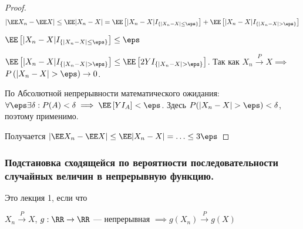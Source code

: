 \begin{proof} 
\[
    |\EE X_n - \EE X| \leq \EE |X_n - X| = 
    \EE \left[ |X_n - X| I_{\left\{ |X_n - X| \leq \eps \right\}} \right] + 
    \EE \left[ |X_n - X| I_{\left\{ |X_n - X| > \eps \right\}} \right]
\]

$\EE \left[ |X_n - X| I_{\left\{ |X_n - X| \leq \eps \right\}} \right] \leq \eps$

$\EE \left[ |X_n - X| I_{\left\{ |X_n - X| > \eps \right\}} \right] \leq 
\EE \left[ 2 Y I_{\left\{ |X_n - X| > \eps \right\}} \right]$. Так как $X_n \xrightarrow{P} X \implies$ 
$P \left( |X_n - X| > \eps \right) \rightarrow 0$.

По Абсолютной непрерывности математического ожидания: 
$\forall \eps \exists \delta: P(A) < \delta \implies \EE \left[ Y I_A \right] < \eps$.
Здесь $P(|X_n - X| > \eps) < \delta$, поэтому применимо.

Получается $|\EE X_n - \EE X| \leq \EE |X_n - X| = \mathellipsis \leq 3 \eps$
\end{proof} 

\subsubsection{Подстановка сходящейся по вероятности последовательности случайных величин в непрерывную функцию.}
Это лекция 1, если что

\begin{proposition} 
$X_n \xrightarrow{P} X$, $g: \RR \to \RR$ — непрерывная $\implies g(X_n) \xrightarrow{P} g(X)$
\end{proposition} 

